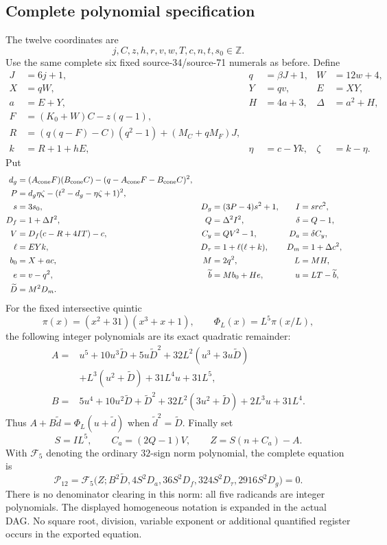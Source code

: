 \subsection{Complete polynomial specification}
The twelve coordinates are
\[
 j,C,z,h,r,v,w,T,c,n,t,s_0\in\mathbb Z.
\]
Use the same complete six fixed source-34/source-71 numerals as before.
Define
\begin{align*}
 J&=6j+1,&q&=\beta J+1,&W&=12w+4,\\
 X&=qW,&Y&=qv,&E&=XY,\\
 a&=E+Y,&H&=4a+3,&\Delta&=a^2+H,\\
 F&=(K_0+W)C-z(q-1),&&&\\
 R&=(q(q-F)-C)(q^2-1)+(M_C+qM_F)J,&&&\\
 k&=R+1+hE,&\eta&=c-Yk,&\zeta&=k-\eta.
\end{align*}
Put
\begin{align*}
 d_g&=(A_{\rm cone}F)(B_{\rm cone}C)
          -(q-A_{\rm cone}F-B_{\rm cone}C)^2,\\
 P&=d_g\eta\zeta-(t^2-d_g-\eta\zeta+1)^2,\\
 s&=3s_0,&D_g&=(3P-4)s^2+1,&I&=src^2,\\
 D_f&=1+\Delta I^2,&Q&=\Delta^2 I^2,&\delta&=Q-1,\\
 V&=D_f(c-R+4IT)-c,&C_y&=QV^2-1,&D_a&=\delta C_y,\\
 \ell&=EYk,&D_\tau&=1+\ell(\ell+k),&D_m&=1+\Delta c^2,\\
 b_0&=X+ac,&M&=2q^2,&L&=MH,\\
 e&=v-q^2,&\widetilde b&=Mb_0+He,&
 u&=LT-\widetilde b,\\
 \widetilde D&=M^2D_m.&&&
\end{align*}
For the fixed intersective quintic
\[
 \pi(x)=(x^2+31)(x^3+x+1),\qquad
 \Phi_L(x)=L^5\pi(x/L),
\]
the following integer polynomials are its exact quadratic remainder:
\begin{align*}
 A={}&u^5+10u^3\widetilde D+5u\widetilde D^2
       +32L^2(u^3+3u\widetilde D)\\
    &+L^3(u^2+\widetilde D)+31L^4u+31L^5,\\
 B={}&5u^4+10u^2\widetilde D+\widetilde D^2
       +32L^2(3u^2+\widetilde D)+2L^3u+31L^4.
\end{align*}
Thus $A+B\widetilde d=\Phi_L(u+\widetilde d)$ when
$\widetilde d^2=\widetilde D$. Finally set
\[
 S=IL^5,\qquad C_a=(2Q-1)V,\qquad Z=S(n+C_a)-A.
\]
With $\mathcal F_5$ denoting the ordinary $32$-sign norm polynomial,
the complete equation is
\[
 \boxed{\mathcal P_{12}
 =\mathcal F_5\bigl(Z;B^2\widetilde D,
 4S^2D_a,36S^2D_f,324S^2D_\tau,2916S^2D_g\bigr)=0.}
\]
There is no denominator clearing in this norm: all five radicands are
integer polynomials. The displayed homogeneous notation is expanded in
the actual DAG. No square root, division, variable exponent or additional
quantified register occurs in the exported equation.

